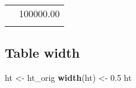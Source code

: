 \documentclass[]{article}
\newenvironment{Shaded}{\begin{snugshade}}{\end{snugshade}}
\newcommand{\KeywordTok}[1]{\textcolor[rgb]{0.13,0.29,0.53}{\textbf{{#1}}}}
\newcommand{\FloatTok}[1]{\textcolor[rgb]{0.00,0.00,0.81}{{#1}}}
\newcommand{\StringTok}[1]{\textcolor[rgb]{0.31,0.60,0.02}{{#1}}}
\newcommand{\NormalTok}[1]{{#1}}
\begin{document}
\begin{table}[h]
\begin{raggedright}
\begin{tabularx}{0.25\textwidth}{>{}X >{}X}
\arrayrulecolor{black}
\multicolumn{1}{|l|}{\rule{0pt}{\baselineskip+4pt}\hspace*{4pt}Thyme\hspace*{4pt}\rule[-4pt]{0pt}{4pt}} & \multicolumn{1}{l|}{\rule{0pt}{\baselineskip+4pt}\hspace*{4pt}100000.00\hspace*{4pt}\rule[-4pt]{0pt}{4pt}} \tabularnewline[-0.5pt]
\hhline{>{\arrayrulecolor{black}}|>{\arrayrulecolor{black}}->{\arrayrulecolor{black}}|>{\arrayrulecolor{black}}-}
\arrayrulecolor{black}
\end{tabularx}
\par\end{raggedright}
\end{table}

\FloatBarrier

\subsection{Table width}\label{table-width}

\begin{Shaded}
\begin{Highlighting}[]
\NormalTok{ht <-}\StringTok{ }\NormalTok{ht_orig}
\KeywordTok{width}\NormalTok{(ht) <-}\StringTok{ }\FloatTok{0.5}
\NormalTok{ht}
\end{Highlighting}
\end{Shaded}
\end{document}
